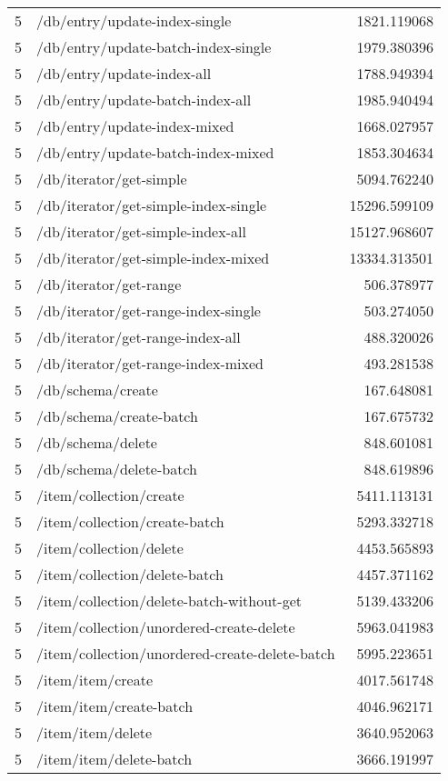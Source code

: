 \begin{longtable}{rlr}
5 & /db/entry/update-index-single & 1821.119068 \\
5 & /db/entry/update-batch-index-single & 1979.380396 \\
5 & /db/entry/update-index-all & 1788.949394 \\
5 & /db/entry/update-batch-index-all & 1985.940494 \\
5 & /db/entry/update-index-mixed & 1668.027957 \\
5 & /db/entry/update-batch-index-mixed & 1853.304634 \\
5 & /db/iterator/get-simple & 5094.762240 \\
5 & /db/iterator/get-simple-index-single & 15296.599109 \\
5 & /db/iterator/get-simple-index-all & 15127.968607 \\
5 & /db/iterator/get-simple-index-mixed & 13334.313501 \\
5 & /db/iterator/get-range & 506.378977 \\
5 & /db/iterator/get-range-index-single & 503.274050 \\
5 & /db/iterator/get-range-index-all & 488.320026 \\
5 & /db/iterator/get-range-index-mixed & 493.281538 \\
5 & /db/schema/create & 167.648081 \\
5 & /db/schema/create-batch & 167.675732 \\
5 & /db/schema/delete & 848.601081 \\
5 & /db/schema/delete-batch & 848.619896 \\
5 & /item/collection/create & 5411.113131 \\
5 & /item/collection/create-batch & 5293.332718 \\
5 & /item/collection/delete & 4453.565893 \\
5 & /item/collection/delete-batch & 4457.371162 \\
5 & /item/collection/delete-batch-without-get & 5139.433206 \\
5 & /item/collection/unordered-create-delete & 5963.041983 \\
5 & /item/collection/unordered-create-delete-batch & 5995.223651 \\
5 & /item/item/create & 4017.561748 \\
5 & /item/item/create-batch & 4046.962171 \\
5 & /item/item/delete & 3640.952063 \\
5 & /item/item/delete-batch & 3666.191997 \\

\end{longtable}
